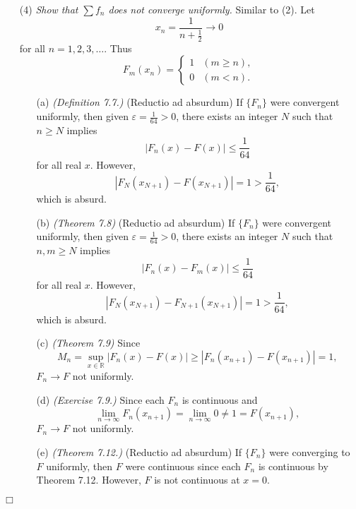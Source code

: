 \documentclass{article}
\begin{document}
\begin{enumerate}
\item[(4)]
\emph{Show that $\sum f_n$ does not converge uniformly.}
Similar to (2).
Let
\[
  x_n = \frac{1}{n+\frac{1}{2}} \to 0
\]
for all $n=1,2,3,\ldots$.
Thus
\begin{equation*}
  F_m(x_n) =
    \begin{cases}
      1 & (m \geq n), \\
      0 & (m < n).
    \end{cases}
\end{equation*}

  \begin{enumerate}
  \item[(a)]
  \emph{(Definition 7.7.)}
  (Reductio ad absurdum)
  If $\{F_n\}$ were convergent uniformly, then
  given $\varepsilon = \frac{1}{64} > 0$,
  there exists an integer $N$ such that $n \geq N$ implies
  \[
    |F_n(x) - F(x)| \leq \frac{1}{64}
  \]
  for all real $x$.
  However,
  \[
    |F_N(x_{N+1}) - F(x_{N+1})| =  1 > \frac{1}{64},
  \]
  which is absurd.

  \item[(b)]
  \emph{(Theorem 7.8)}
  (Reductio ad absurdum)
  If $\{F_n\}$ were convergent uniformly, then
  given $\varepsilon = \frac{1}{64} > 0$,
  there exists an integer $N$ such that $n,m \geq N$ implies
  \[
    |F_n(x) - F_m(x)| \leq \frac{1}{64}
  \]
  for all real $x$.
  However,
  \[
    |F_N(x_{N+1}) - F_{N+1}(x_{N+1})| =  1 > \frac{1}{64},
  \]which is absurd.

  \item[(c)]
  \emph{(Theorem 7.9)}
  Since
  \[
    M_n
    = \sup_{x \in \mathbb{R}}|F_n(x) - F(x)|
    \geq |F_n(x_{n+1}) - F(x_{n+1})| = 1,
  \]
  $F_n \to F$ not uniformly.

  \item[(d)]
  \emph{(Exercise 7.9.)}
  Since
  each $F_n$ is continuous and
  \[
    \lim_{n \to \infty} F_n(x_{n+1}) = \lim_{n \to \infty} 0 \neq 1 = F(x_{n+1}),
  \]
  $F_n \to F$ not uniformly.

  \item[(e)]
  \emph{(Theorem 7.12.)}
  (Reductio ad absurdum)
  If $\{F_n\}$ were converging to $F$ uniformly, then
  $F$ were continuous since each $F_n$ is continuous by Theorem 7.12.
  However, $F$ is not continuous at $x = 0$.
  \end{enumerate}
\end{enumerate}
$\Box$ \\\\
\end{document}
